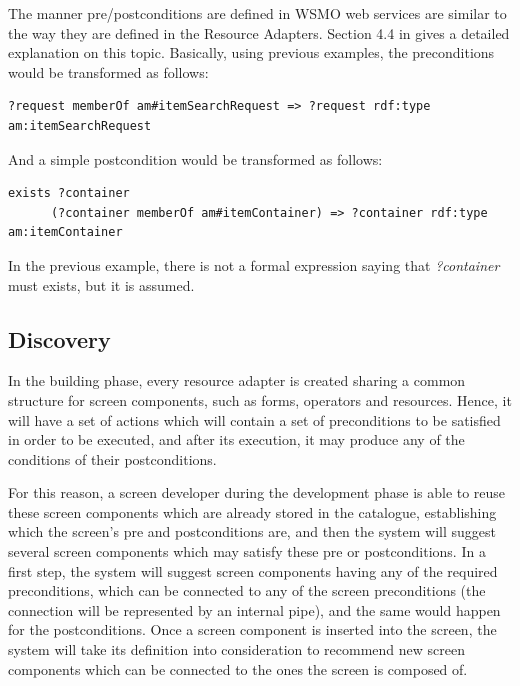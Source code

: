 \documentclass{fast_latex}
\begin{document}
The manner pre/postconditions are defined in WSMO web services are similar to the way they are defined in the Resource Adapters. Section 4.4 in \cite{moller2010fast_ontology} gives a detailed explanation on this topic. Basically, using previous examples, the preconditions would be transformed as follows:

\begin{verbatim}
?request memberOf am#itemSearchRequest => ?request rdf:type am:itemSearchRequest
\end{verbatim}

And a simple postcondition would be transformed as follows:

\begin{verbatim}
exists ?container 
      (?container memberOf am#itemContainer) => ?container rdf:type am:itemContainer
\end{verbatim}

In the previous example, there is not a formal expression saying that \emph{?container} must exists, but it is assumed.


\subsection{Discovery} %
\label{sub:discovery}

In the building phase, every resource adapter is created sharing a common structure for screen components, such as forms, operators and resources. Hence, it will have a set of actions which will contain a set of preconditions to be satisfied in order to be executed, and after its execution, it may produce any of the conditions of their postconditions.

For this reason, a screen developer during the development phase is able to reuse these screen components which are already stored in the catalogue, establishing which the screen's pre and postconditions are, and then the system will suggest several screen components which may satisfy these pre or postconditions. In a first step, the system will suggest screen components having any of the required preconditions, which can be connected to any of the screen preconditions (the connection will be represented by an internal pipe), and the same would happen for the postconditions. Once a screen component is inserted into the screen, the system will take its definition into consideration to recommend new screen components which can be connected to the ones the screen is composed of.
\end{document}
